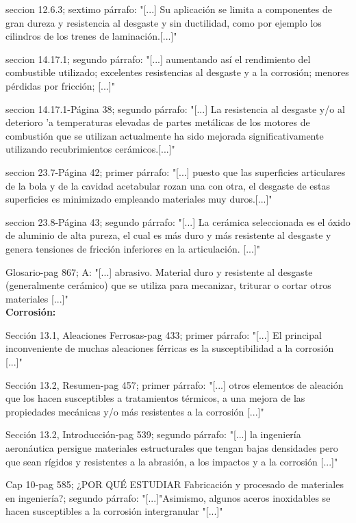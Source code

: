 \documentclass[12pt,a4paper]{article}
\begin{document}
seccion 12.6.3; sextimo párrafo: "[...] Su aplicación se limita a componentes de gran dureza y resistencia al desgaste y sin ductilidad, como por ejemplo los cilindros de los trenes de laminación.[...]"

seccion 14.17.1; segundo párrafo: "[...] aumentando así el rendimiento del combustible utilizado; excelentes resistencias al desgaste y a la corrosión; menores pérdidas por fricción; [...]"

seccion 14.17.1-Página 38; segundo párrafo: "[...] La resistencia al desgaste y/o al deterioro 'a temperaturas elevadas de partes metálicas de los motores de combustión que se utilizan actualmente ha sido mejorada significativamente utilizando recubrimientos cerámicos.[...]"

seccion 23.7-Página 42; primer párrafo: "[...] puesto que las superficies articulares de la bola y de la cavidad acetabular rozan una con otra, el desgaste de estas superficies es minimizado empleando materiales muy duros.[...]"

seccion 23.8-Página 43; segundo párrafo: "[...] La cerámica seleccionada es el óxido de aluminio de alta pureza, el cual es más duro y más resistente al desgaste y genera tensiones de fricción inferiores en la articulación. [...]"

Glosario-pag 867; A: "[...] abrasivo. Material duro y resistente al desgaste (generalmente cerámico) que se utiliza para mecanizar, triturar o cortar otros materiales [...]"\\[0.1cm]

\textbf{Corrosión:}

Sección 13.1, Aleaciones Ferrosas-pag 433; primer párrafo: "[...] El principal inconveniente de muchas aleaciones férricas es la susceptibilidad a la corrosión [...]"

Sección 13.2, Resumen-pag 457; primer párrafo: "[...] otros elementos de aleación que los hacen susceptibles a tratamientos térmicos, a una mejora de las propiedades mecánicas y/o más resistentes a la corrosión [...]"

Sección 13.2, Introducción-pag 539; segundo párrafo: "[...] la ingeniería aeronáutica persigue materiales estructurales que tengan bajas densidades pero que sean rígidos y resistentes a la abrasión, a los impactos y a la corrosión [...]"

Cap 10-pag 585; ¿POR QUÉ ESTUDIAR Fabricación y procesado de materiales en ingeniería?; segundo párrafo: "[...]"Asimismo, algunos aceros inoxidables se hacen susceptibles a la corrosión intergranular "[...]"
\end{document}
